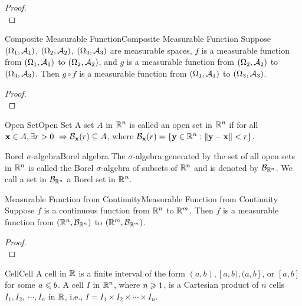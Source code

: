 \documentclass{elegantbook}
\begin{document}
\begin{proof}
\\[4cm]\vspace{0.01cm}
\end{proof}

\begin{theorem}{Composite Measurable Function}{Composite Measurable Function}
Suppose $(\Omega_1,\mathcal{A}_1)$, $(\Omega_2,\mathcal{A}_2)$, $(\Omega_3,\mathcal{A}_3)$ are measurable spaces, $f$ is a measurable function from $(\Omega_1,\mathcal{A}_1)$ to $(\Omega_2,\mathcal{A}_2)$, and $g$ is a measurable function from $(\Omega_2,\mathcal{A}_2)$ to $(\Omega_3,\mathcal{A}_3)$. Then $g\circ f$ is a measurable function from  $(\Omega_1,\mathcal{A}_1)$ to $(\Omega_3,\mathcal{A}_3)$.
\end{theorem}

\begin{proof}
\\[4cm]\vspace{0.01cm}
\end{proof}

\begin{definition}{Open Set}{Open Set}
A set $A$ in $\mathbb{R}^n$ is called an open set in $\mathbb{R}^n$ if for all $\mx\in A, \exists r>0\ \Rightarrow\mb_{\mx}(r)\subseteq A$, where $\mathcal{B}_{\mathbf{x}}(r)=\left\{\mathbf{y}\in\mathbb{R}^n:\Arrowvert\mathbf{y}-\mathbf{x}\Arrowvert<r\right\}$.
\end{definition}

\begin{definition}{Borel $\sigma$-algebra}{Borel algebra}
The $\sigma$-algebra generated by the set of all open sets in $\mathbb{R}^n$ is called the Borel $\sigma$-algebra of subsets of $\mathbb{R}^n$ and is denoted by $\mathcal{B}_{\mathbb{R}^n}$. We call a set in $\mathcal{B}_{\mathbb{R}^n}$ a Borel set in $\mathbb{R}^n$.
\end{definition}

\begin{theorem}{Measurable Function from Continuity}{Measurable Function from Continuity}
Suppose $f$ is a continuous function from $\mathbb{R}^n$ to $\mathbb{R}^m$. Then $f$ is a measurable function from $(\mathbb{R}^n,\mathcal{B}_{\mathbb{R}^n})$ to $(\mathbb{R}^m,\mathcal{B}_{\mathbb{R}^m})$.
\end{theorem}

\begin{proof}
\\[4cm]\vspace{0.01cm}
\end{proof}

\begin{definition}{Cell}{Cell}
A cell in $\mathbb{R}$ is a f\/inite interval of the form $(a,b),[a,b),(a,b]$, or $[a,b]$ for some $a\leqslant b$. A cell $I$ in $\mathbb{R}^n$, where $n\geqslant1$, is a Cartesian product of $n$ cells $I_1,I_2,\ \cdots,I_n$ in $\mathbb{R}$, i.e., $I=I_1\times I_2\times\cdots\times I_n$.
\end{definition}
\end{document}
